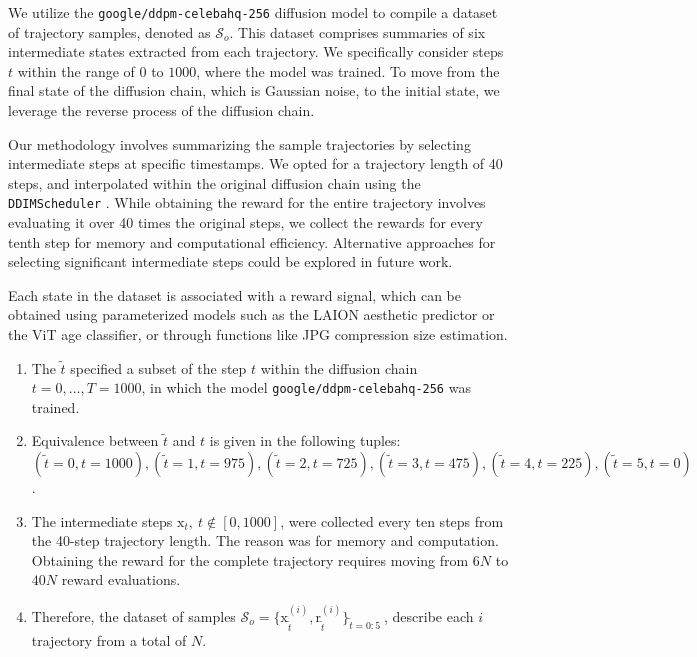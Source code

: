 We utilize the \texttt{google/ddpm-celebahq-256} diffusion model \cite{ho2020denoising} to compile a dataset of trajectory samples, denoted as $\mathcal{S}_o$. This dataset comprises summaries of six intermediate states extracted from each trajectory. We specifically consider steps $t$ within the range of $0$ to $1000$, where the model was trained. To move from the final state of the diffusion chain, which is Gaussian noise, to the initial state, we leverage the reverse process of the diffusion chain.

Our methodology involves summarizing the sample trajectories by selecting intermediate steps at specific timestamps. We opted for a trajectory length of 40 steps, and interpolated within the original diffusion chain using the \texttt{DDIMScheduler} \cite{song2020denoising}. While obtaining the reward for the entire trajectory involves evaluating it over 40 times the original steps, we collect the rewards for every tenth step for memory and computational efficiency. Alternative approaches for selecting significant intermediate steps could be explored in future work.

Each state in the dataset is associated with a reward signal, which can be obtained using parameterized models such as the LAION aesthetic predictor or the ViT age classifier, or through functions like JPG compression size estimation.

\begin{enumerate}
\item The $\tilde{t}$ specified a subset of the step $t$ within the diffusion chain $t=0, \dots, T=1000$, in which the model \texttt{google/ddpm-celebahq-256} was trained.
\item Equivalence between $\tilde{t}$ and $t$ is given in the following tuples:
$(\tilde{t}=0, t=1000), (\tilde{t}=1, t=975), (\tilde{t}=2, t=725), (\tilde{t}=3, t=475), (\tilde{t}=4, t=225), (\tilde{t}=5, t=0)$.
\item The intermediate steps $\mathrm{x}_{t}, ~t\notin [0,1000]$, were collected every ten steps from the 40-step trajectory length. The reason was for memory and computation. Obtaining the reward for the complete trajectory requires moving from $6N$ to $40N$ reward evaluations.
\item Therefore, the dataset of samples $\mathcal{S}_{o} =  \big\{\mathrm{x}_{\tilde{t}}^{(i)}, \mathrm{r}_{\tilde{t}}^{(i)} \big\}_{\tilde{t}=0:5}~$, describe each $i$ trajectory from a total of $N$.
\end{enumerate}

